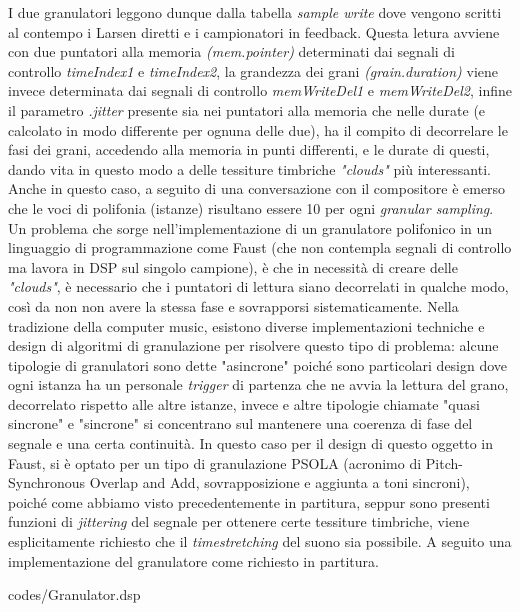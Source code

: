 I due granulatori leggono dunque dalla tabella \textit{sample write} dove vengono scritti
al contempo i Larsen diretti e i campionatori in feedback. 
Questa letura avviene con due puntatori alla memoria \textit{(mem.pointer)} determinati 
dai segnali di controllo \textit{timeIndex1} e \textit{timeIndex2}, la grandezza dei grani 
\textit{(grain.duration)} viene invece determinata dai segnali di controllo 
\textit{memWriteDel1} e \textit{memWriteDel2}, infine il parametro \textit{.jitter}
presente sia nei puntatori alla memoria che nelle durate (e calcolato in modo differente per ognuna delle due),
ha il compito di decorrelare le fasi dei grani, accedendo alla memoria in punti differenti,
e le durate di questi, dando vita in questo modo a delle tessiture timbriche \textit{"clouds"} più interessanti.
Anche in questo caso, a seguito di una conversazione con il compositore è emerso che le voci di polifonia
(istanze) risultano essere 10 per ogni \textit{granular sampling}.
Un problema che sorge nell'implementazione di un granulatore polifonico in un linguaggio di 
programmazione come Faust (che non contempla segnali di controllo ma lavora in DSP sul singolo campione),
è che in necessità di creare delle \textit{"clouds"}, è necessario che i puntatori di lettura
siano decorrelati in qualche modo, così da non non avere la stessa fase e sovrapporsi sistematicamente.
Nella tradizione della computer music, esistono diverse implementazioni techniche e design 
di algoritmi di granulazione per risolvere questo tipo di problema:
alcune tipologie di granulatori sono dette "asincrone" poiché sono particolari design dove
ogni istanza ha un personale \textit{trigger} 
di partenza che ne avvia la lettura del grano, decorrelato rispetto alle altre istanze,
invece e altre tipologie chiamate "quasi sincrone" e "sincrone" si concentrano sul mantenere
una coerenza di fase del segnale e una certa continuità.
In questo caso per il design di questo oggetto in Faust, si è optato per un tipo di granulazione
PSOLA (acronimo di Pitch-Synchronous Overlap and Add, sovrapposizione e aggiunta a toni sincroni), 
poiché come abbiamo visto precedentemente in partitura, 
seppur sono presenti funzioni di \textit{jittering} del segnale
per ottenere certe tessiture timbriche, viene esplicitamente richiesto
che il \textit{timestretching} del suono sia possibile. 
A seguito una implementazione del granulatore come richiesto in partitura.

\vspace{0.5cm} 

{codes/Granulator.dsp}

